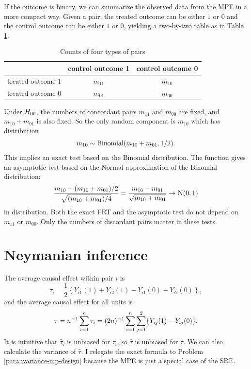  
 
 \begin{example}
 \label{eg::mcnenar-test-binary}
 If the outcome is binary, we can summarize the observed data from the MPE in a more compact way. Given a pair, the treated outcome can be either $1$ or $0$ and the control outcome can be either $1$ or $0$, yielding a two-by-two table as in Table \ref{tb::binarymatchedpairs}. 
 
\begin{table}
\centering
\caption{Counts of four types of pairs}\label{tb::binarymatchedpairs}
\begin{tabular}{ccc}
\hline 
 & control outcome 1 & control outcome 0\\
 \hline 
treated outcome 1 & $m_{11}$ & $m_{10}$ \\
treated outcome 0 & $m_{01}$ & $m_{00}$ \\
\hline 
\end{tabular}
\end{table} 
 
Under $H_{0\textsc{f}}$, the numbers of concordant pairs $m_{11}$ and $m_{00}$ are fixed, and $m_{10} + m_{01}$ is also fixed. So the only random component is $m_{10}$ which has distribution 
$$
m_{10} \sim \textup{Binomial}( m_{10} + m_{01}, 1/2  ).
$$ 
This implies an exact test based on the Binomial distribution. The  function  gives an asymptotic test based on the Normal approximation of the Binomial distribution:
$$
\frac{   m_{10}  - (m_{10} + m_{01})/2  }{  \sqrt{  (m_{10} + m_{01}) / 4   } } 
= \frac{ m_{10}  -  m_{01}   }{  \sqrt{ m_{10} + m_{01}    }  }
\rightarrow \N01  
$$
in distribution. Both the exact FRT and the asymptotic test do not depend on $m_{11}$ or $m_{00}$. Only the numbers of discordant pairs matter in these tests. 
 \end{example}
 
 
 
\section{Neymanian inference}
 
The average causal effect within pair $i$ is 
 $$
 \tau_i = \frac{1}{2}  \left\{    Y_{i1}(1) + Y_{i2}(1) -     Y_{i1}(0)  - Y_{i2}(0)     \right\},
 $$
 and the average causal effect for all units is
$$
\tau = n^{-1} \sum_{i=1}^n  \tau_i  = (2n)^{-1} \sum_{i=1}^n \sum_{j=1}^2 \{  Y_{ij}(1) - Y_{ij}(0)   \} .
$$
It is intuitive that  $\hat{\tau}_i $ is unbiased for $ \tau_i $, so $\hat{\tau}  $ is unbiased for $\tau$. We can also calculate the variance of $\hat{\tau}  $. I relegate the exact formula to Problem \ref{para::variance-mp-design}  because the MPE is just a special case of the SRE. 


